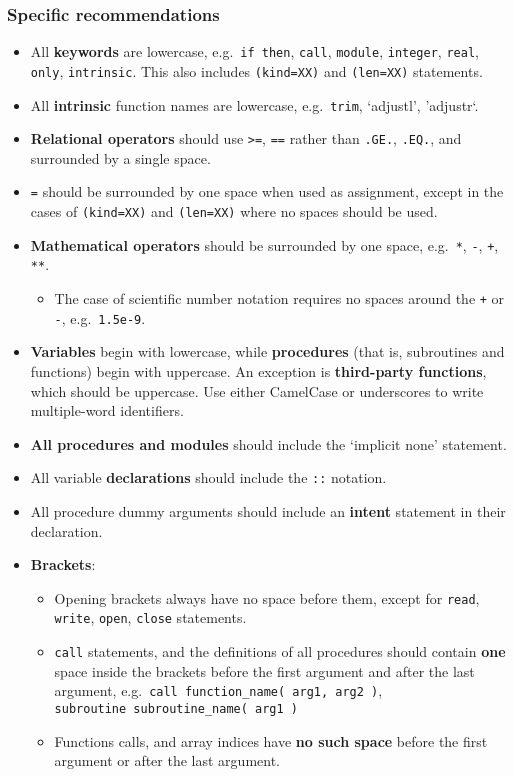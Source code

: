 \subsubsection{Specific
  recommendations} \label{specific-recommendations}

\begin{itemize}
\item All \textbf{keywords} are lowercase, e.g.~\texttt{if\ then},
  \texttt{call}, \texttt{module}, \texttt{integer}, \texttt{real},
  \texttt{only}, \texttt{intrinsic}. This also includes
  \texttt{(kind=XX)} and \texttt{(len=XX)} statements.
\item All \textbf{intrinsic} function names are lowercase,
  e.g.~\texttt{trim}, `adjustl', 'adjustr`.
\item \textbf{Relational operators} should use
  \texttt{\textgreater{}=}, \texttt{==} rather than \texttt{.GE.},
  \texttt{.EQ.}, and surrounded by a single space.
\item \texttt{=} should be surrounded by one space when used as
  assignment, except in the cases of \texttt{(kind=XX)} and
  \texttt{(len=XX)} where no spaces should be used.
\item \textbf{Mathematical operators} should be surrounded by one
  space, e.g.~\texttt{*}, \texttt{-}, \texttt{+}, \texttt{**}.
  \begin{itemize}
  \item The case of scientific number notation requires no spaces
    around the \texttt{+} or \texttt{-}, e.g.~\texttt{1.5e-9}.
  \end{itemize}
\item \textbf{Variables} begin with lowercase, while
  \textbf{procedures} (that is, subroutines and functions) begin with
  uppercase. An exception is \textbf{third-party functions}, which
  should be uppercase. Use either CamelCase or underscores to write
  multiple-word identifiers.
\item \textbf{All procedures and modules} should include the `implicit
  none' statement.
\item All variable \textbf{declarations} should include the
  \texttt{::} notation.
\item All procedure dummy arguments should include an \textbf{intent}
  statement in their declaration.
\item \textbf{Brackets}:
  \begin{itemize}
  \item Opening brackets always have no space before them, except for
    \texttt{read}, \texttt{write}, \texttt{open}, \texttt{close}
    statements.
  \item \texttt{call} statements, and the definitions of all
    procedures should contain \textbf{one} space inside the brackets
    before the first argument and after the last argument,
    e.g.~\texttt{call\ function\_name(\ arg1,\ arg2\ )},
    \texttt{subroutine\ subroutine\_name(\ arg1\ )}
  \item Functions calls, and array indices have \textbf{no such space}
    before the first argument or after the last argument.
  \end{itemize}
\end{itemize}
